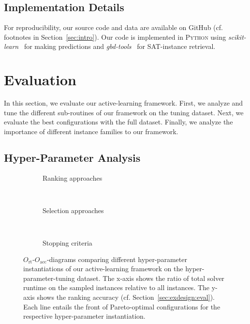 \documentclass[sn-basic, Numbered]{sn-jnl} %
\begin{document}
\subsection{Implementation Details}

For reproducibility, our source code and data are available on GitHub (cf. footnotes in Section~\ref{sec:intro}).
Our code is implemented in \textsc{Python} using \emph{scikit-learn}~\cite{scikit-learn} for making predictions and \emph{gbd-tools}~\cite{IserS18} for SAT-instance retrieval.


\section{Evaluation}
\label{sec:eval}

In this section, we evaluate our active-learning framework.
First, we analyze and tune the different sub-routines of our framework on the tuning dataset.
Next, we evaluate the best configurations with the full dataset.
Finally, we analyze the importance of different instance families to our framework.

\subsection{Hyper-Parameter Analysis}

\begin{figure}[tbp!]
  \centering
  \begin{subfigure}{1.0\textwidth}
    \caption{Ranking approaches}
    \label{fig:annitraincolorranking}
  \end{subfigure}
  \\
  \vspace{0.2cm}
  \begin{subfigure}{1.0\textwidth}
    \caption{Selection approaches}
    \label{fig:annitraincolorselection}
  \end{subfigure}
  \\
  \vspace{0.2cm}
  \begin{subfigure}{1.0\textwidth}
    \caption{Stopping criteria}
    \label{fig:annitraincolorstopping}
  \end{subfigure}
  \caption{
    $O_{\operatorname{rt}}$-$O_{\operatorname{acc}}$-diagrams comparing different hyper-parameter instantiations of our active-learning framework on the hyper-parameter-tuning dataset.
    The x-axis shows the ratio of total solver runtime on the sampled instances relative to all instances.
    The y-axis shows the ranking accuracy (cf. Section~\ref{sec:exdesign:eval}).
    Each line entails the front of Pareto-optimal configurations for the respective hyper-parameter instantiation.
  }
  \label{fig:e2eallsolvers}
\end{figure}
\end{document}
